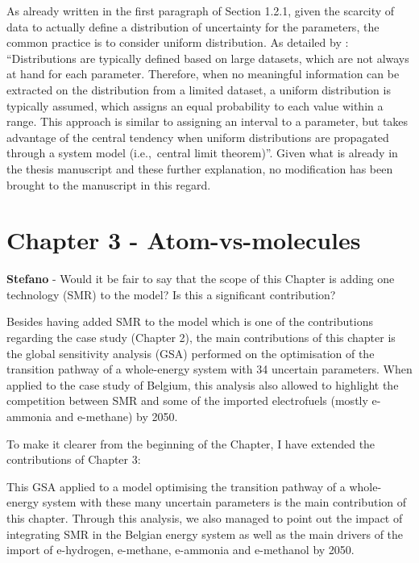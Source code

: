 \documentclass[12pt,a4paper]{article}
\def\ie{i.e.,\ }
\begin{document}
\noindent As already written in the first paragraph of Section 1.2.1, given the scarcity of data to actually define a distribution of uncertainty for the parameters, the common practice is to consider uniform distribution. As detailed by \citet{coppittersthesis}: ``Distributions are typically defined based on large datasets, which are not always at hand for each parameter. Therefore, when no meaningful information can be extracted on the distribution from a limited dataset, a uniform distribution is typically assumed, which assigns an equal probability to each value within a range. This approach is similar to assigning an interval to a parameter, but takes advantage of the central tendency when uniform distributions are propagated through a system model (\ie central limit theorem)''. Given what is already in the thesis manuscript and these further explanation, no modification has been brought to the manuscript in this regard. 

\section{Chapter 3 - Atom-vs-molecules}
\label{Chap_atom_vs_molecules}

\begin{mdframed}[style=comment] %
{\color{orange} \textbf{Stefano}} - Would it be fair to say that the scope of this Chapter is adding one technology (SMR) to the model? Is this a significant contribution?
\end{mdframed}

\noindent Besides having added SMR to the model which is one of the contributions regarding the case study (Chapter 2), the main contributions of this chapter is the global sensitivity analysis (GSA) performed on the optimisation of the transition pathway of a whole-energy system with 34 uncertain parameters. When applied to the case study of Belgium, this analysis also allowed to highlight the competition between SMR and some of the imported electrofuels (mostly e-ammonia and e-methane) by 2050. 

To make it clearer from the beginning of the Chapter, I have extended {\color{blue}the contributions of Chapter 3}:

\begin{mdframed}[style=manuscript] %
This GSA applied to a model optimising the transition pathway of a whole-energy system with these many uncertain parameters is the main contribution of this chapter. Through this analysis, we also managed to point out the impact of integrating SMR in the Belgian energy system as well as the main drivers of the import of e-hydrogen, e-methane, e-ammonia and e-methanol by 2050.
\end{mdframed}
\end{document}

